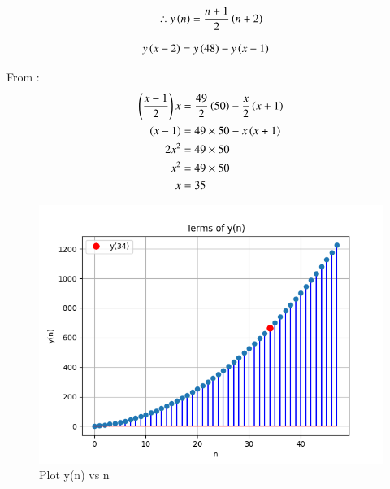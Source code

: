 \documentclass[journal,12pt,twocolumn]{IEEEtran}
\theoremstyle{remark}
\begin{document}
\begin{align}
    \therefore y\left(n\right)=\frac{n+1}{2}\left(n+2\right)
\end{align}

\begin{align}
y\left(x-2\right)&=y\left(48\right)-y\left(x-1\right)
\end{align}

From :
\begin{align}
\left(\frac{x-1}{2}\right)x&=\frac{49}{2}\left(50\right)-\frac{x}{2}\left(x+1\right)\\
\left(x-1\right)&=49\times50 - x\left(x+1\right)\\
2x^{2}&=49\times50\\
x^{2}&=49\times50\\
x&=35
\end{align}

\newpage
\begin{figure}[h]
    
    \includegraphics[width=\columnwidth]{figs/fig1.png}
    \caption{Plot y(n) vs n}
\end{figure}

 
\end{document}

